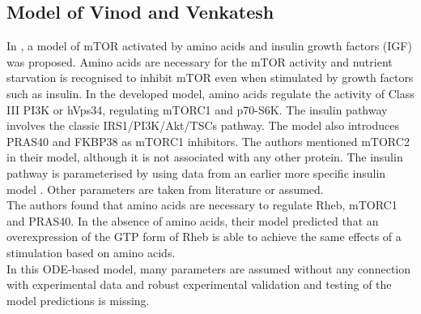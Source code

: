 \subsection{Model of Vinod and Venkatesh}
\label{subsec:Model of Vinod and Venkatesh}
In \citep{Vinod2009}, a model of mTOR activated by amino acids and insulin growth factors (IGF) was proposed. Amino acids are necessary for the mTOR activity and nutrient starvation is recognised to inhibit mTOR even when stimulated by growth factors such as insulin. In the developed model, amino acids regulate the activity of Class III PI3K or hVps34, regulating mTORC1 and p70-S6K. The insulin pathway involves the classic IRS1/PI3K/Akt/TSCs pathway. The model also introduces PRAS40 and FKBP38 as mTORC1 inhibitors. The authors mentioned mTORC2 in their model, although it is not associated with any other protein. The insulin pathway is parameterised by using data from an earlier more specific insulin model \citep{Giri2004}. Other parameters are taken from literature or assumed.\\
The authors found that amino acids are necessary to regulate Rheb, mTORC1 and PRAS40. In the absence of amino acids, their model predicted that an overexpression of the GTP form of Rheb is able to achieve the same effects of a stimulation based on amino acids.\\
In this ODE-based model, many parameters are assumed without any connection with experimental data and robust experimental validation and testing of the model predictions is missing.


